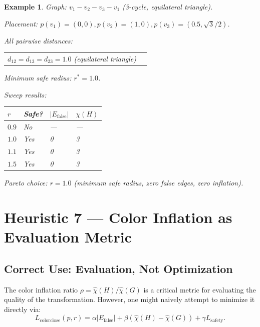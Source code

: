 \documentclass[11pt]{article}
\newtheorem{example}[theorem]{Example}
\newcommand{\Efalse}{E_{\mathrm{false}}}
\newcommand{\chihat}{\widehat{\chi}}
\begin{document}
\begin{example}
Graph: $v_1 - v_2 - v_3 - v_1$ (3-cycle, equilateral triangle).

Placement: $p(v_1) = (0, 0), p(v_2) = (1, 0), p(v_3) = (0.5, \sqrt{3}/2)$.

All pairwise distances:
\begin{center}
\begin{tabular}{@{}ll@{}}
$d_{12} = d_{13} = d_{23} = 1.0$ (equilateral triangle) \\
\end{tabular}
\end{center}

Minimum safe radius: $r^* = 1.0$.

Sweep results:
\begin{center}
\begin{tabular}{@{}llll@{}}
\toprule
$r$ & Safe? & $|\Efalse|$ & $\chi(H)$ \\
\midrule
$0.9$ & No & --- & --- \\
$1.0$ & Yes & 0 & 3 \\
$1.1$ & Yes & 0 & 3 \\
$1.5$ & Yes & 0 & 3 \\
\toprule
\end{tabular}
\end{center}

Pareto choice: $r = 1.0$ (minimum safe radius, zero false edges, zero inflation).
\end{example}

\newpage

\section{Heuristic 7 — Color Inflation as Evaluation Metric}

\subsection{Correct Use: Evaluation, Not Optimization}

The color inflation ratio $\rho = \chihat(H) / \chihat(G)$ is a critical metric
for evaluating the quality of the transformation. However, one might
naively attempt to minimize it directly via:
\[
  L_{\mathrm{colorclose}}(p,r) = \alpha |\Efalse| + \beta (\chihat(H) - \chihat(G)) + \gamma L_{\mathrm{safety}}.
\]
\end{document}
